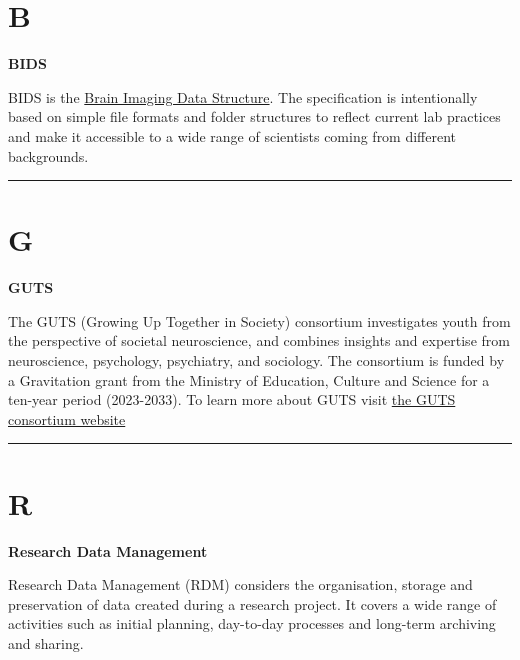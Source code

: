 \documentclass[
  letterpaper,
  DIV=11,
  numbers=noendperiod]{scrreprt}
\begin{document}
\hypertarget{sec-b}{%
\section*{B}\label{sec-b}}


\textbf{BIDS}

BIDS is the \href{https://bids.neuroimaging.io/}{Brain Imaging Data
Structure}. The specification is intentionally based on simple file
formats and folder structures to reflect current lab practices and make
it accessible to a wide range of scientists coming from different
backgrounds.

\begin{center}\rule{0.5\linewidth}{0.5pt}\end{center}

\hypertarget{sec-g}{%
\section*{G}\label{sec-g}}


\textbf{GUTS}

The GUTS (Growing Up Together in Society) consortium investigates youth
from the perspective of societal neuroscience, and combines insights and
expertise from neuroscience, psychology, psychiatry, and sociology. The
consortium is funded by a Gravitation grant from the Ministry of
Education, Culture and Science for a ten-year period (2023-2033). To
learn more about GUTS visit
\href{https://growinguptogetherinsociety.com/}{the GUTS consortium
website}

\begin{center}\rule{0.5\linewidth}{0.5pt}\end{center}

\hypertarget{sec-r}{%
\section*{R}\label{sec-r}}


\textbf{Research Data Management}

Research Data Management (RDM) considers the organisation, storage and
preservation of data created during a research project. It covers a wide
range of activities such as initial planning, day-to-day processes and
long-term archiving and sharing.
\end{document}
